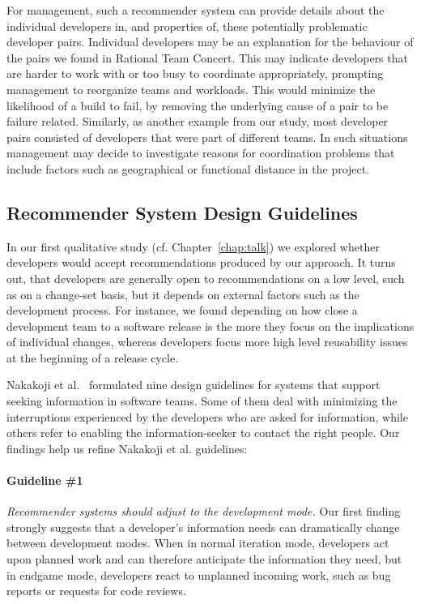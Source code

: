 For management, such a recommender system can provide details about the
individual developers in, and properties of, these potentially problematic
developer pairs. Individual developers may be an explanation for the behaviour of
the pairs we found in Rational Team Concert. This may indicate developers that are
harder to work with or too busy to coordinate appropriately, prompting management
to reorganize teams and workloads. This would minimize the likelihood of a build
to fail, by removing the underlying cause of a pair to be failure related.
Similarly, as another example from our study, most developer pairs
consisted of developers that were part of different teams. In such
situations management may decide to investigate reasons for coordination
problems that include factors such as geographical or functional distance in the project.

\subsection{Recommender System Design Guidelines}
\label{sec:sub:tools}
In our first qualitative study (cf. Chapter~\ref{chap:talk}) we explored whether developers would accept recommendations produced by our approach.
It turns out, that developers are generally open to recommendations on a low level, such as on a change-set basis, but it depends on external factors such as the development process.
For instance, we found depending on how close a development team to a software release is the more they focus on the implications of individual changes, whereas developers focus more high level reusability issues at the beginning of a release cycle.

Nakakoji et al.~\cite{nakakoji2010:rdc} formulated nine design guidelines for systems that support seeking information in software teams. Some of them deal with minimizing the interruptions experienced by the developers who are asked for information, while others refer to enabling the information-seeker to contact the right people. Our findings help us refine Nakakoji et al. guidelines:

\paragraph{Guideline \#1} \emph{Recommender systems should adjust to the development mode.}
Our first finding strongly suggests that a developer's information needs can dramatically change between development modes. 
%
When in normal iteration mode, developers act upon planned work and can therefore anticipate the information they need, but in endgame mode, developers react to unplanned incoming work, such as bug reports or requests for code reviews. 

